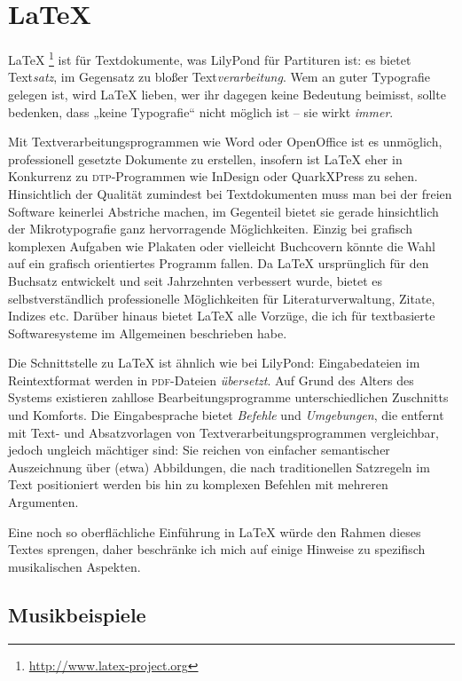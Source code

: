 \documentclass[DIV=12]{scrreprt}
\begin{document}
\chapter{\LaTeX}
\label{chap:pt_latex}

\LaTeX%
\footnote{\url{http://www.latex-project.org}}
ist für Textdokumente, was LilyPond für Partituren ist:
es bietet Text\emph{satz}, im Gegensatz zu bloßer Text\emph{verarbeitung}.
Wem an guter Typografie gelegen ist, wird \LaTeX{} lieben, wer ihr dagegen keine Bedeutung beimisst, sollte bedenken, dass „keine Typografie“ nicht möglich ist -- sie wirkt \emph{immer}. 

Mit Textverarbeitungsprogrammen wie Word oder OpenOffice ist es unmöglich, professionell gesetzte Dokumente zu erstellen, insofern ist \LaTeX{} eher in Konkurrenz zu \textsc{dtp}-Programmen wie InDesign oder QuarkXPress zu sehen.
Hinsichtlich der Qualität zumindest bei Textdokumenten muss man bei der freien Software keinerlei Abstriche machen, im Gegenteil bietet sie gerade hinsichtlich der Mikrotypografie ganz hervorragende Möglichkeiten.
Einzig bei grafisch komplexen Aufgaben wie Plakaten oder vielleicht Buchcovern könnte die Wahl auf ein grafisch orientiertes Programm fallen.
Da \LaTeX{} ursprünglich für den Buchsatz entwickelt und seit Jahrzehnten verbessert wurde, bietet es selbstverständlich professionelle Möglichkeiten für Literaturverwaltung, Zitate, Indizes etc.
Darüber hinaus bietet \LaTeX{} alle Vorzüge, die ich für textbasierte Softwaresysteme im Allgemeinen beschrieben habe.

Die Schnittstelle zu \LaTeX{} ist ähnlich wie bei LilyPond:
Eingabedateien im Reintextformat werden in \textsc{pdf}-Dateien \emph{übersetzt}.
Auf Grund des Alters des Systems existieren zahllose Bearbeitungsprogramme unterschiedlichen Zuschnitts und Komforts.
Die Eingabesprache bietet \emph{Befehle} und \emph{Umgebungen}, die entfernt mit Text- und Absatzvorlagen von Textverarbeitungsprogrammen vergleichbar, jedoch ungleich mächtiger sind:
Sie reichen von einfacher semantischer Auszeichnung über (etwa) Abbildungen, die nach traditionellen Satzregeln im Text positioniert werden bis hin zu komplexen Befehlen mit mehreren Argumenten.

Eine noch so oberflächliche Einführung in \LaTeX{} würde den Rahmen dieses Textes sprengen, daher beschränke ich mich auf einige Hinweise zu spezifisch musikalischen Aspekten.


\section{Musikbeispiele}
\label{sec:pt_music-examples}
\end{document}
